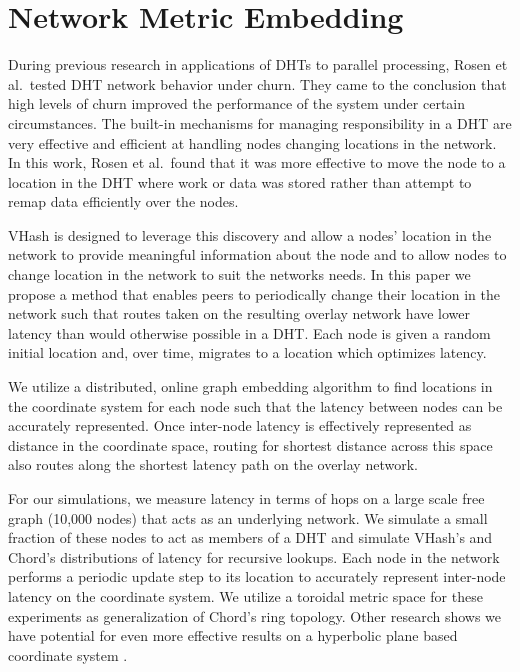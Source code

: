 \documentclass[10pt, conference, letterpaper]{IEEEtran}
\begin{document}
\section{Network Metric Embedding}
\label{networkEmbedding}
During previous research in applications of DHTs \cite{andrew-poster} to parallel processing, Rosen et al.\ tested DHT network behavior under churn. 
They came to the conclusion that high levels of churn improved the performance of the system under certain circumstances.
The built-in mechanisms for managing responsibility in a DHT are very effective and efficient at handling nodes changing locations in the network.
In this work, Rosen et al.\ found that it was more effective to move the node to a location in the DHT where work or data was stored rather than attempt to remap data efficiently over the nodes.

VHash is designed to leverage this discovery and allow a nodes' location in the network to provide meaningful information about the node and to allow nodes to change location in the network to suit the networks needs.
In this paper we propose a method that enables peers to periodically change their location in the network such that routes taken on the resulting overlay network have lower latency than would otherwise possible in a DHT.
Each node is given a random initial location and, over time, migrates to a location which optimizes latency.


We utilize a distributed, online graph embedding algorithm to find locations in the coordinate system for each node such that the latency between nodes can be accurately represented.
Once inter-node latency is effectively represented as distance in the coordinate space, routing for shortest distance across this space also routes along the shortest latency path on the overlay network.

For our simulations, we measure latency in terms of hops on a large scale free graph (10,000 nodes) that acts as an underlying network.
We simulate a small fraction of these nodes to act as members of a DHT and simulate VHash's and Chord's distributions of latency for recursive lookups.
Each node in the network performs a periodic update step to its location to accurately represent inter-node latency on the coordinate system.
We utilize a toroidal metric space for these experiments as generalization of Chord's ring topology.
Other research shows we have potential for even more effective results on a hyperbolic plane based coordinate system \cite{papadopoulos2010greedy}.
\end{document}
